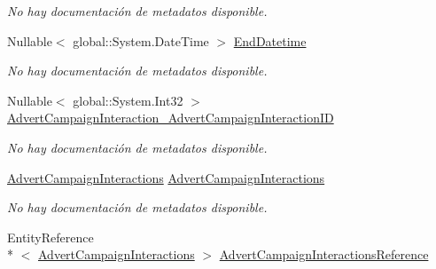 \begin{DoxyCompactItemize}
\begin{DoxyCompactList}\small\item\em No hay documentación de metadatos disponible. \end{DoxyCompactList}\item 
Nullable$<$ global\-::\-System.\-Date\-Time $>$ \hyperlink{class_microsoft_1_1_samples_1_1_kinect_1_1_basic_interactions_1_1_advert_campaign_detail_interactions_aa582772f83a2012ac319b4dab494d69b}{End\-Datetime}
\begin{DoxyCompactList}\small\item\em No hay documentación de metadatos disponible. \end{DoxyCompactList}\item 
Nullable$<$ global\-::\-System.\-Int32 $>$ \hyperlink{class_microsoft_1_1_samples_1_1_kinect_1_1_basic_interactions_1_1_advert_campaign_detail_interactions_a09afe7bf4e9cd41651392d6d45b0561c}{Advert\-Campaign\-Interaction\-\_\-\-Advert\-Campaign\-Interaction\-I\-D}
\begin{DoxyCompactList}\small\item\em No hay documentación de metadatos disponible. \end{DoxyCompactList}\item 
\hyperlink{class_microsoft_1_1_samples_1_1_kinect_1_1_basic_interactions_1_1_advert_campaign_interactions}{Advert\-Campaign\-Interactions} \hyperlink{class_microsoft_1_1_samples_1_1_kinect_1_1_basic_interactions_1_1_advert_campaign_detail_interactions_a59bd33a980a36b0dd4d94447f716b8c2}{Advert\-Campaign\-Interactions}
\begin{DoxyCompactList}\small\item\em No hay documentación de metadatos disponible. \end{DoxyCompactList}\item 
Entity\-Reference\\*
$<$ \hyperlink{class_microsoft_1_1_samples_1_1_kinect_1_1_basic_interactions_1_1_advert_campaign_interactions}{Advert\-Campaign\-Interactions} $>$ \hyperlink{class_microsoft_1_1_samples_1_1_kinect_1_1_basic_interactions_1_1_advert_campaign_detail_interactions_ade932c94917f3995eaecf102094d1e00}{Advert\-Campaign\-Interactions\-Reference}

\end{DoxyCompactItemize}
